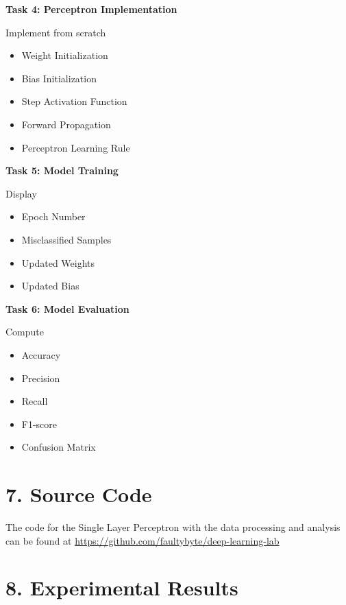 \documentclass[11pt]{article}
\begin{document}
\vspace{2mm}

\textbf{Task 4: Perceptron Implementation}

Implement from scratch

\begin{itemize}
\item Weight Initialization
\item Bias Initialization
\item Step Activation Function
\item Forward Propagation
\item Perceptron Learning Rule
\end{itemize}

\vspace{2mm}

\textbf{Task 5: Model Training}

Display

\begin{itemize}
\item Epoch Number
\item Misclassified Samples
\item Updated Weights
\item Updated Bias
\end{itemize}

\vspace{2mm}

\textbf{Task 6: Model Evaluation}

Compute

\begin{itemize}
\item Accuracy
\item Precision
\item Recall
\item F1-score
\item Confusion Matrix
\end{itemize}


\section*{7. Source Code}
The code for the Single Layer Perceptron with the data processing and analysis can be found at \url{https://github.com/faultybyte/deep-learning-lab}


\section*{8. Experimental Results}
\end{document}
